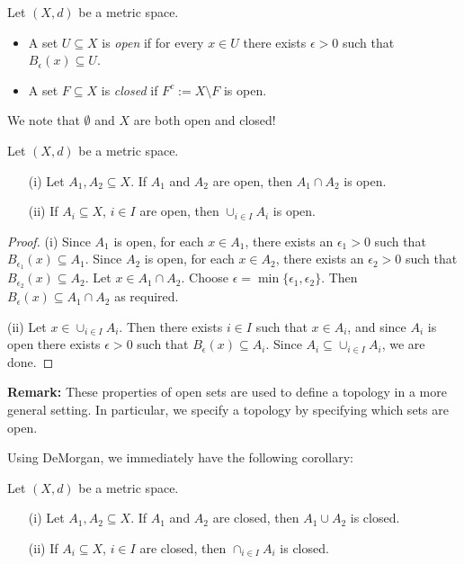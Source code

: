 \documentclass{article}
\begin{document}
\begin{definition}
Let $(X,d)$ be a metric space. 
\begin{itemize}
    \item A set $U \subseteq X$ is \emph{open} if for every $x \in U$ there exists $\epsilon>0$ such that $B_\epsilon(x) \subseteq U$.
    \item A set $F \subseteq X$ is \emph{closed} if $F^c:= X\setminus F$ is open.
\end{itemize}
\end{definition}

We note that $\emptyset$ and $X$ are both open and closed! 

\vspace{1em}

\begin{proposition}
\label{prop:open_sets}
Let $(X,d)$ be a metric space. 
 \begin{enumerate}
     \item[(i)] Let $A_1,A_2\subseteq X$. If $A_1$ and $A_2$ are open, then $A_1 \cap A_2$ is open.
     \item[(ii)] If $A_i \subseteq X$, $i \in I$ are open, then $\cup_{i\in I} A_i$ is open.
 \end{enumerate}
\end{proposition}
\begin{proof}
(i) Since $A_1$ is open, for each $x \in A_1$, there exists an $\epsilon_1 > 0$ such that $B_{\epsilon_1}(x) \subseteq  A_1$. Since $A_2$ is open, for each $x \in A_2$, there exists an $\epsilon_2 > 0$ such that $B_{\epsilon_2}(x) \subseteq A_2$. Let $x \in A_1 \cap A_2$. Choose $\epsilon = \min\{\epsilon_1,\epsilon_2\}$. Then  $B_{\epsilon}(x) \subseteq A_1 \cap A_2$ as required. 

(ii) Let $x\in \cup_{i\in I} A_i$. Then there exists $i \in I$ such that $x \in A_i$, and since $A_i$ is open there exists $\epsilon>0$ such that $B_\epsilon(x) \subseteq  A_i$. Since $A_i \subseteq \cup_{i\in I} A_i$, we are done.
\end{proof}

\textbf{Remark:}
These properties of open sets are used to define a topology in a more general setting. In particular, we specify a topology by specifying which sets are open.

Using DeMorgan, we immediately have the following corollary:
\begin{corollary}
\label{cor:closed_sets}
Let $(X,d)$ be a metric space. 
 \begin{enumerate}
     \item[(i)] Let $A_1,A_2\subseteq X$. If $A_1$ and $A_2$ are closed, then $A_1 \cup A_2$ is closed.
     \item[(ii)]  If $A_i \subseteq X$, $i \in I$ are closed, then $\cap_{i\in I} A_i$ is closed.
 \end{enumerate}
\end{corollary}
\end{document}
